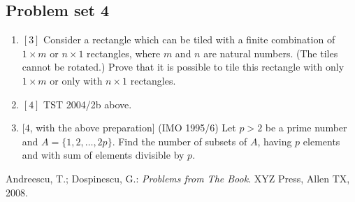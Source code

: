 \subsection{Problem set 4}
\begin{enumerate}
\item $[3]$ Consider a rectangle which can be tiled with a finite combination of $1\times m$ or $n\times 1$ rectangles, where $m$ and $n$ are natural numbers. (The tiles cannot be rotated.) Prove that it is possible to tile this rectangle with only $1\times m$ or only with $n\times 1$ rectangles.
\item $[4]$ TST 2004/2b above.
\item $[4$, with the above preparation] (IMO 1995/6) Let $p>2$ be a prime number and $A=\{1,2,\ldots, 2p\}$. Find the number of subsets of $A$, having $p$ elements and with sum of elements divisible by $p$.

\end{enumerate}
\begin{thebibliography}{9}
 Andreescu, T.; Dospinescu, G.: {\it Problems from The Book}. XYZ Press, Allen TX, 2008.
\end{thebibliography}
